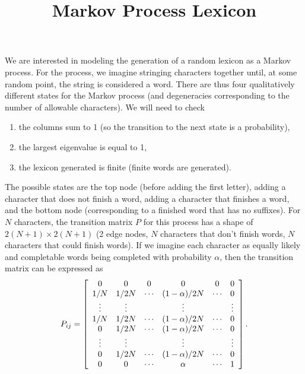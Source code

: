 \documentclass[11pt]{article}
\title{Markov Process Lexicon}
\begin{document}
\maketitle

We are interested in modeling the generation of a random lexicon as a Markov process. For the process, we imagine stringing characters together until, at some random point, the string is considered a word. There are thus four qualitatively different states for the Markov process (and degeneracies corresponding to the number of allowable characters). We will need to check
\begin{enumerate}
\item the columns sum to 1 (so the transition to the next state is a probability),
\item the largest eigenvalue is equal to 1,
\item the lexicon generated is finite (finite words are generated).
\end{enumerate}
The possible states are the top node (before adding the first letter), adding a character that does not finish a word, adding a character that finishes a word, and the bottom node (corresponding to a finished word that has no suffixes). For $N$ characters, the transition matrix $P$ for this process has a shape of $2(N+1)\times2(N+1)$ (2 edge nodes, $N$ characters that don't finish words, $N$ characters that could finish words). If we imagine each character as equally likely and completable words being completed with probability $\alpha$, then the transition matrix can be expressed as
\begin{equation}
P_{ij}=\left[\begin{array}{c c c c c c}
0 & 0 & 0 & 0 & 0 & 0 \\
1/N & 1/2N&\cdots & (1-\alpha)/2N & \cdots & 0\\
\vdots & \vdots & & \vdots & & \vdots\\
1/N & 1/2N & \cdots & (1-\alpha)/2N & \cdots & 0\\
0 & 1/2N & \cdots & (1-\alpha)/2N & \cdots & 0\\
\vdots & \vdots & & \vdots & & \vdots\\
0 & 1/2N & \cdots & (1-\alpha)/2N & \cdots & 0\\
0 & 0 & \cdots & \alpha & \cdots & 1
\end{array}
\right].
\end{equation}
\end{document}
